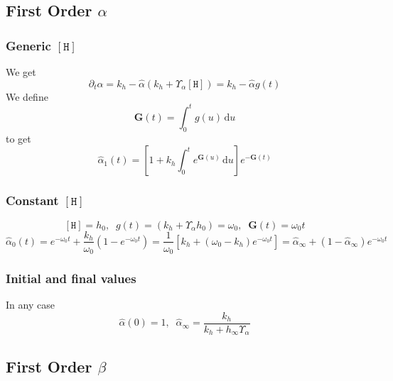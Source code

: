 \documentclass[aps,onecolumn,12pt]{revtex4}
\newcommand{\mychem}[1]{\mathtt{#1}}
\newcommand{\myconc}[1]{\left\lbrack{#1}\right\rbrack}
\newcommand{\spproton}{\mychem{H}}
\newcommand{\proton}{\myconc{\spproton}}
\newcommand{\ig}{\ensuremath{\mathbf{G}}}
\begin{document}
\subsection{First Order $\alpha$}

\subsubsection{Generic $\proton$}
We get
\begin{equation}
	\partial_t \hat\alpha = k_h - \hat\alpha\left( k_h+ \Upsilon_\alpha \proton \right) = k_h - \hat\alpha g(t)
\end{equation}
We define
\begin{equation}
	\ig(t) = \int_0^t g(u) \,\mathrm{d} u
\end{equation}
to get
\begin{equation}
	\hat \alpha_1(t) = \left[ 1 + k_h \int_0^t e^{\ig(u)}  \,\mathrm{d} u \right] e^{-\ig(t)}
\end{equation}
\subsubsection{Constant $\proton$}
\begin{equation}
	\proton=h_0,\;\;g(t) = (k_h+\Upsilon_\alpha h_0)=\omega_0,\;\;\ig(t) = \omega_0 t
\end{equation}
\begin{equation}
	\hat\alpha_0(t) = e^{-\omega_0t} + \dfrac{k_h}{\omega_0}\left( 1 - e^{-\omega_0 t}\right) 
	= \dfrac{1}{\omega_0} \left[k_h + \left(\omega_0-k_h\right) e^{-\omega_0 t} \right] = \hat\alpha_\infty + \left(1-\hat\alpha_\infty\right) e^{-\omega_0 t}
\end{equation}

\subsubsection{Initial and final values}
In any case
\begin{equation}
	\hat\alpha(0) = 1, \;\; \hat\alpha_\infty = \dfrac{k_h}{k_h+h_\infty\Upsilon_\alpha}
\end{equation}


\subsection{First Order $\beta$}
\end{document}
